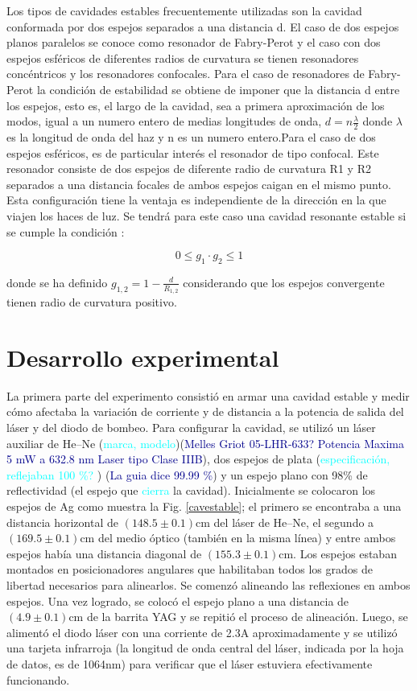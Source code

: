 \documentclass[10pt, a4paper]{article}%
\begin{document}
\begin{multicols}{2}
Los tipos de cavidades estables frecuentemente utilizadas son la cavidad conformada por dos espejos separados a una distancia d. El caso de dos espejos planos paralelos se conoce como resonador de Fabry-Perot y el caso con dos espejos esféricos de diferentes radios de curvatura se tienen resonadores concéntricos y los resonadores confocales. Para el caso de resonadores de Fabry-Perot la condición de estabilidad se obtiene de imponer que la distancia d entre los espejos, esto es, el largo de la cavidad, sea a primera aproximación de los modos, igual a un numero entero de medias longitudes de onda, ${ d = n \frac{\lambda}{2} }$ donde ${\lambda}$ es la longitud de onda del haz y n es un numero entero.Para el caso de dos espejos esféricos, es de particular interés el resonador de tipo confocal. Este resonador consiste de dos espejos de diferente radio de curvatura R1 y R2 separados a una distancia focales de ambos espejos caigan en el mismo punto. Esta configuración tiene la ventaja es independiente de la dirección en la que viajen los haces de luz. Se tendrá para este caso una cavidad resonante estable si se cumple la condición : 

\begin{equation}
    0 \leq g_1 \cdot g_2 \leq 1
\end{equation}

donde se ha definido ${g_{1,2} = 1 - \frac{d}{R_{1,2}}}$ considerando que los espejos convergente tienen radio de curvatura positivo.

\section{Desarrollo experimental}
La primera parte del experimento consistió en armar una cavidad estable y medir cómo afectaba la variación de corriente y de distancia a la potencia de salida del láser y del diodo de bombeo. Para configurar la cavidad, se utilizó un láser auxiliar de He--Ne (\textcolor{cyan}{marca, modelo})({\textcolor{DarkBlue}{Melles Griot 05-LHR-633? Potencia Maxima 5 mW a 632.8 nm Laser tipo Clase IIIB}}), dos espejos de plata (\textcolor{cyan}{especificación, reflejaban 100 \%? }) ({\textcolor{DarkBlue} {La guia dice 99.99 \%}}) y un espejo plano con 98\% de reflectividad (el espejo que \textcolor{cyan}{cierra} la cavidad). Inicialmente se colocaron los espejos de Ag como muestra la Fig. \ref{cavestable}; el primero se encontraba a una distancia horizontal de $(148.5 \pm 0.1)$cm del láser de He--Ne, el segundo a $(169.5 \pm 0.1)$cm del medio óptico (también en la misma línea) y entre ambos espejos había una distancia diagonal de $(155.3 \pm 0.1)$cm. Los espejos estaban montados en posicionadores angulares que habilitaban todos los grados de libertad necesarios para alinearlos. Se comenzó alineando las reflexiones en ambos espejos. Una vez logrado, se colocó el espejo plano a una distancia de $(4.9 \pm 0.1)$cm de la barrita YAG y se repitió el proceso de alineación. Luego, se alimentó el diodo láser con una corriente de 2.3A aproximadamente y se utilizó una tarjeta infrarroja (la longitud de onda central del láser, indicada por la hoja de datos, es de 1064nm) para verificar que el láser estuviera efectivamente funcionando. 


\end{multicols}
\end{document}
